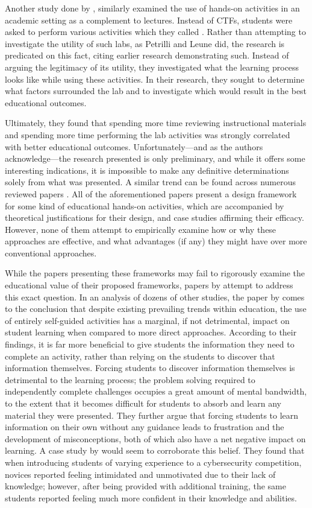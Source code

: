     Another study done by \textcite{Z-Zeng}, similarly examined the use of hands-on activities in an academic setting as a complement to lectures. Instead of CTFs, students were asked to perform various activities which they called . Rather than attempting to investigate the utility of such labs, as Petrilli and Leune did, the research is predicated on this fact, citing earlier research demonstrating such. Instead of arguing the legitimacy of its utility, they investigated what the learning process looks like while using these activities. In their research, they sought to determine what factors surrounded the lab and to investigate which would result in the best educational outcomes. 

    Ultimately, they found that spending more time reviewing instructional materials and spending more time performing the lab activities was strongly correlated with better educational outcomes. Unfortunately---and as the authors acknowledge---the research presented is only preliminary, and while it offers some interesting indications, it is impossible to make any definitive determinations solely from what was presented. A similar trend can be found across numerous reviewed papers \cite{Y-Deng,W-Du,N-Eliot}. All of the aforementioned papers present a design framework for some kind of educational hands-on activities, which are accompanied by theoretical justifications for their design, and case studies affirming their efficacy. However, none of them attempt to empirically examine how or why these approaches are effective, and what advantages (if any) they might have over more conventional approaches. 

    While the papers presenting these frameworks may fail to rigorously examine the educational value of their proposed frameworks, papers by \textcite{J-Sweller,R-Weiss} attempt to address this exact question. In an analysis of dozens of other studies, the paper by \citeauthor{J-Sweller} comes to the conclusion that despite existing prevailing trends within education, the use of entirely self-guided activities has a marginal, if not detrimental, impact on student learning when compared to more direct approaches. According to their findings, it is far more beneficial to give students the information they need to complete an activity, rather than relying on the students to discover that information themselves. Forcing students to discover information themselves is detrimental to the learning process; the problem solving required to independently complete challenges occupies a great amount of mental bandwidth, to the extent that it becomes difficult for students to absorb and learn any material they were  presented. They further argue that forcing students to learn information on their own without any guidance leads to frustration and the development of misconceptions, both of which also have a net negative impact on learning. A case study by \textcite{L-Thomas} would seem to corroborate this belief. They found that when introducing students of varying experience to a cybersecurity competition, novices reported feeling intimidated and unmotivated due to their lack of knowledge; however, after being provided with additional training, the same students reported feeling much more confident in their knowledge and abilities. 

